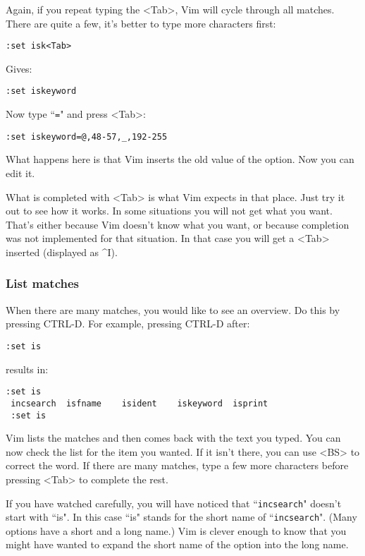 Again, if you repeat typing the <Tab>, Vim will cycle through all matches.
There are quite a few, it's better to type more characters first:

\begin{Verbatim}[samepage=true]
 :set isk<Tab>
\end{Verbatim}

Gives:

\begin{Verbatim}[samepage=true]
 :set iskeyword
\end{Verbatim}

Now type ``\texttt{=}" and press <Tab>:

\begin{Verbatim}[samepage=true]
 :set iskeyword=@,48-57,_,192-255
\end{Verbatim}

What happens here is that Vim inserts the old value of the option.
Now you can edit it.

What is completed with <Tab> is what Vim expects in that place.
Just try it out to see how it works.
In some situations you will not get what you want.
That's either because Vim doesn't know what you want, or because completion was not implemented for that situation.
In that case you will get a <Tab> inserted (displayed as \textasciicircum I).
\subsubsection{List matches}
When there are many matches, you would like to see an overview.
Do this by pressing CTRL-D.
For example, pressing CTRL-D after:

\begin{Verbatim}[samepage=true]
 :set is
\end{Verbatim}

results in:

\begin{Verbatim}[samepage=true]
 :set is
 incsearch  isfname    isident    iskeyword  isprint
 :set is
\end{Verbatim}

Vim lists the matches and then comes back with the text you typed.
You can now check the list for the item you wanted.
If it isn't there, you can use <BS> to correct the word.
If there are many matches, type a few more characters before pressing <Tab> to complete the rest.

If you have watched carefully, you will have noticed that ``\texttt{incsearch}" doesn't start with ``is".
In this case ``is" stands for the short name of ``\texttt{incsearch}".
(Many options have a short and a long name.)  Vim is clever enough to know that you might have wanted to expand the short name of the option into the long name.
